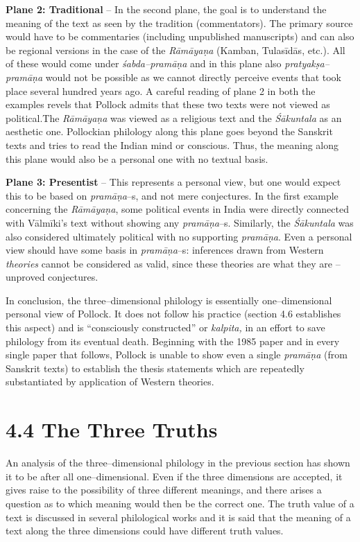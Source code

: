 \textbf{Plane 2: Traditional} – In the second plane, the goal is to understand the meaning of the text as seen by the tradition (commentators). The primary source would have to be commentaries (including unpublished manuscripts) and can also be regional versions in the case of the \textit{Rāmāyaṇa }(Kamban, Tulasīdās, etc.). All of these would come under \textit{śabda–pramāṇa }and in this plane also \textit{pratyakṣa–pramāṇa} would not be possible as we cannot directly perceive events that took place several hundred years ago. A careful reading of plane 2 in both the examples revels that Pollock admits that these two texts were not viewed as political.The \textit{Rāmāyaṇa }was viewed as a religious text and the \textit{Śākuntala} as an aesthetic one. Pollockian philology along this plane goes beyond the Sanskrit texts and tries to read the Indian mind or conscious. Thus, the meaning along this plane would also be a personal one with no textual basis.

\textbf{Plane 3: Presentist }– This represents a personal view, but one would expect this to be based on \textit{pramāṇa}–s, and not mere conjectures. In the first example concerning the \textit{Rāmāyaṇa}, some political events in India were directly connected with Vālmīki’s text without showing any \textit{pramāṇa}–s. Similarly, the \textit{Śākuntala }was also considered ultimately political with no supporting \textit{pramāṇa}. Even a personal view should have some basis in \textit{pramāṇa}–s: inferences drawn from Western \textit{theories} cannot be considered as valid, since these theories are what they are – unproved conjectures.

In conclusion, the three–dimensional philology is essentially one–dimensional personal view of Pollock. It does not follow his practice (section 4.6 establishes this aspect) and is “consciously constructed” or \textit{kalpita,} in an effort to save philology from its eventual death. Beginning with the 1985 paper and in every single paper that follows, Pollock is unable to show even a single \textit{pramāṇa }(from Sanskrit texts) to establish the thesis statements which are repeatedly substantiated by application of Western theories.

\vspace{-.3cm}

\section*{4.4 The Three Truths}

An analysis of the three–dimensional philology in the previous section has shown it to be after all one–dimensional. Even if the three dimensions are accepted, it gives raise to the possibility of three different meanings, and there arises a question as to which meaning would then be the correct one. The truth value of a text is discussed in several philological works and it is said that the meaning of a text along the three dimensions could have different truth values.

